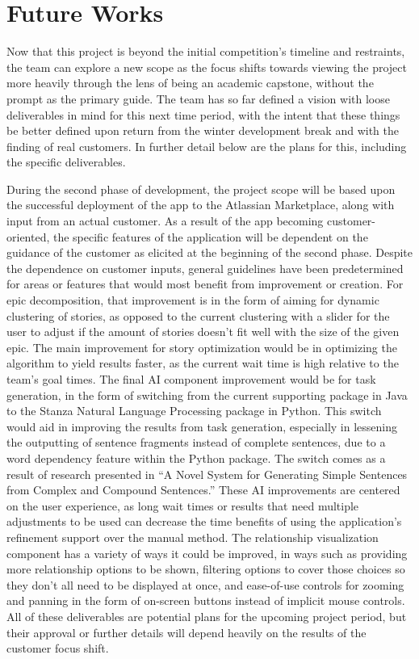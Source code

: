 \section{Future Works}
Now that this project is beyond the initial competition’s timeline and restraints, the team can explore a new scope as the focus shifts towards viewing the project more heavily through the lens of being an academic capstone, without the prompt as the primary guide. The team has so far defined a vision with loose deliverables in mind for this next time period, with the intent that these things be better defined upon return from the winter development break and with the finding of real customers. In further detail below are the plans for this, including the specific deliverables.

During the second phase of development, the project scope will be based upon the successful deployment of the app to the Atlassian Marketplace, along with input from an actual customer.  As a result of the app becoming customer-oriented, the specific features of the application will be dependent on the guidance of the customer as elicited at the beginning of the second phase. Despite the dependence on customer inputs, general guidelines have been predetermined for areas or features that would most benefit from improvement or creation. For epic decomposition, that improvement is in the form of aiming for dynamic clustering of stories, as opposed to the current clustering with a slider for the user to adjust if the amount of stories doesn’t fit well with the size of the given epic. The main improvement for story optimization would be in optimizing the algorithm to yield results faster, as the current wait time is high relative to the team’s goal times. The final AI component improvement would be for task generation, in the form of switching from the current supporting package in Java to the Stanza Natural Language Processing package in Python. This switch would aid in improving the results from task generation, especially in lessening the outputting of sentence fragments instead of complete sentences, due to a word dependency feature within the Python package. The switch comes as a result of research presented in “A Novel System for Generating Simple Sentences from Complex and Compound Sentences.” These AI improvements are centered on the user experience, as long wait times or results that need multiple adjustments to be used can decrease the time benefits of using the application’s refinement support over the manual method. The relationship visualization component has a variety of ways it could be improved, in ways such as providing more relationship options to be shown, filtering options to cover those choices so they don’t all need to be displayed at once, and ease-of-use controls for zooming and panning in the form of on-screen buttons instead of implicit mouse controls. All of these deliverables are potential plans for the upcoming project period, but their approval or further details will depend heavily on the results of the customer focus shift.